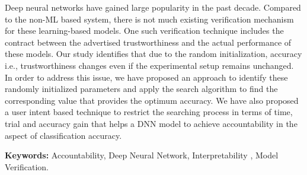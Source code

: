 Deep neural networks have gained large popularity in the past decade. Compared to the non-ML based system, there is not much existing verification mechanism for these learning-based models. One such verification technique includes the contract between the advertised trustworthiness and the actual performance of these models. Our study identifies that due to the random initialization, accuracy i.e., trustworthiness changes even if the experimental setup remains unchanged. In order to address this issue, we have proposed an approach to identify these randomly initialized parameters and apply the search algorithm to find the corresponding value that provides the optimum accuracy.
We have also proposed a user intent based technique to restrict the searching process in terms of time, trial and accuracy gain that helps a DNN model to achieve accountability in the aspect of classification accuracy.
 

\textbf{Keywords:} Accountability, Deep Neural Network, Interpretability , Model Verification.
